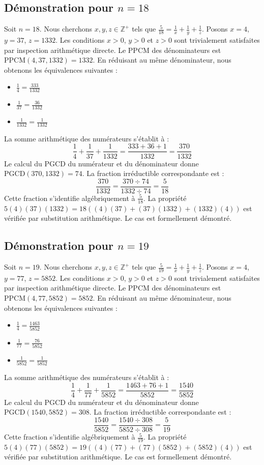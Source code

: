 \documentclass[12pt,a4paper]{article}
\begin{document}
\subsection{Démonstration pour $n = 18$}
Soit $n = 18$. Nous cherchons $x, y, z \in \mathbb{Z}^{+}$ tels que $\frac{5}{18} = \frac{1}{x} + \frac{1}{y} + \frac{1}{z}$.
Posons $x = 4$, $y = 37$, $z = 1332$.
Les conditions $x > 0$, $y > 0$ et $z > 0$ sont trivialement satisfaites par inspection arithmétique directe.
Le PPCM des dénominateurs est $\text{PPCM}(4, 37, 1332) = 1332$.
En réduisant au même dénominateur, nous obtenons les équivalences suivantes :
\begin{itemize}
    \item $\frac{1}{4} = \frac{333}{1332}$
    \item $\frac{1}{37} = \frac{36}{1332}$
    \item $\frac{1}{1332} = \frac{1}{1332}$
\end{itemize}
La somme arithmétique des numérateurs s'établit à :
$$ \frac{1}{4} + \frac{1}{37} + \frac{1}{1332} = \frac{333 + 36 + 1}{1332} = \frac{370}{1332} $$
Le calcul du PGCD du numérateur et du dénominateur donne $\text{PGCD}(370, 1332) = 74$.
La fraction irréductible correspondante est :
$$ \frac{370}{1332} = \frac{370 \div 74}{1332 \div 74} = \frac{5}{18} $$
Cette fraction s'identifie algébriquement à $\frac{5}{18}$.
La propriété $5(4)(37)(1332) = 18((4)(37) + (37)(1332) + (1332)(4))$ est vérifiée par substitution arithmétique.
Le cas est formellement démontré.

\subsection{Démonstration pour $n = 19$}
Soit $n = 19$. Nous cherchons $x, y, z \in \mathbb{Z}^{+}$ tels que $\frac{5}{19} = \frac{1}{x} + \frac{1}{y} + \frac{1}{z}$.
Posons $x = 4$, $y = 77$, $z = 5852$.
Les conditions $x > 0$, $y > 0$ et $z > 0$ sont trivialement satisfaites par inspection arithmétique directe.
Le PPCM des dénominateurs est $\text{PPCM}(4, 77, 5852) = 5852$.
En réduisant au même dénominateur, nous obtenons les équivalences suivantes :
\begin{itemize}
    \item $\frac{1}{4} = \frac{1463}{5852}$
    \item $\frac{1}{77} = \frac{76}{5852}$
    \item $\frac{1}{5852} = \frac{1}{5852}$
\end{itemize}
La somme arithmétique des numérateurs s'établit à :
$$ \frac{1}{4} + \frac{1}{77} + \frac{1}{5852} = \frac{1463 + 76 + 1}{5852} = \frac{1540}{5852} $$
Le calcul du PGCD du numérateur et du dénominateur donne $\text{PGCD}(1540, 5852) = 308$.
La fraction irréductible correspondante est :
$$ \frac{1540}{5852} = \frac{1540 \div 308}{5852 \div 308} = \frac{5}{19} $$
Cette fraction s'identifie algébriquement à $\frac{5}{19}$.
La propriété $5(4)(77)(5852) = 19((4)(77) + (77)(5852) + (5852)(4))$ est vérifiée par substitution arithmétique.
Le cas est formellement démontré.
\end{document}
